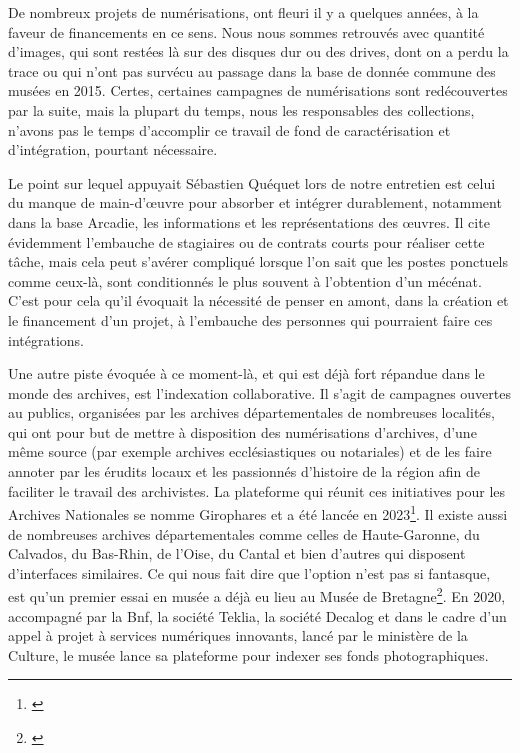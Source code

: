 \noindent
\hspace*{1cm}
\begin{minipage}{\dimexpr\linewidth-2cm}
\fontsize{10}{12}\selectfont
De nombreux projets de numérisations, ont fleuri il y a quelques années, à la faveur de financements en ce sens. Nous nous sommes retrouvés avec quantité d'images, qui sont restées là sur des disques dur ou des drives, dont on a perdu la trace ou qui n'ont pas survécu au passage dans la base de donnée commune des musées en 2015. Certes, certaines campagnes de numérisations sont redécouvertes par la suite, mais la plupart du temps, nous les responsables des collections, n'avons pas le temps d'accomplir ce travail de fond de caractérisation et d'intégration, pourtant nécessaire. \footnotemark{}
\end{minipage}

\vspace{1em}


Le point sur lequel appuyait Sébastien Quéquet lors de notre entretien est celui du manque de main-d’œuvre pour absorber et intégrer durablement, notamment dans la base Arcadie, les informations et les représentations des œuvres. Il cite évidemment l'embauche de stagiaires ou de contrats courts pour réaliser cette tâche, mais cela peut s'avérer compliqué lorsque l'on sait que les postes ponctuels comme ceux-là, sont conditionnés le plus souvent à l'obtention d'un mécénat. C'est pour cela qu'il évoquait la nécessité de penser en amont, dans la création et le financement d'un projet, à l'embauche des personnes qui pourraient faire ces intégrations. 

Une autre piste évoquée à ce moment-là, et qui est déjà fort répandue dans le monde des archives, est l'indexation collaborative. Il s'agit de campagnes ouvertes au publics, organisées par les archives départementales de nombreuses localités, qui ont pour but de mettre à disposition des numérisations d'archives, d'une même source (par exemple archives ecclésiastiques ou notariales) et de les faire annoter par les érudits locaux et les passionnés d'histoire de la région afin de faciliter le travail des archivistes. La plateforme qui réunit ces initiatives pour les Archives Nationales se nomme Girophares et a été lancée en 2023\footnote{\cite{noauthor_archives_nodate}}. Il existe aussi de nombreuses archives départementales comme celles de Haute-Garonne, du Calvados, du Bas-Rhin, de l'Oise, du Cantal et bien d'autres qui disposent d'interfaces similaires. Ce qui nous fait dire que l'option n'est pas si fantasque, est qu'un premier essai en musée a déjà eu lieu au Musée de Bretagne\footnote{\cite{noauthor_lindexation_nodate}}. En 2020, accompagné par la Bnf, la société Teklia, la société Decalog et dans le cadre d’un appel à projet à services numériques innovants, lancé par le ministère de la Culture, le musée lance sa plateforme pour indexer ses fonds photographiques.

